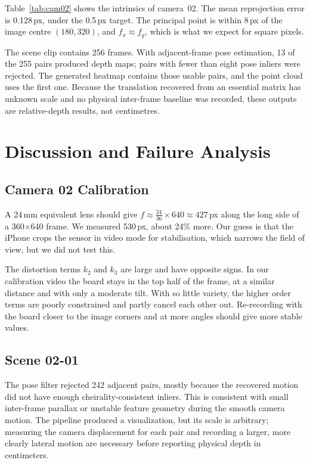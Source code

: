 \documentclass[conference]{assets/latex/IEEEtran}
\begin{document}
Table~\ref{tab:cam02} shows the intrinsics of camera~02. The mean reprojection error is 0.128\,px, under the 0.5\,px target. The principal point is within 8\,px of the image centre $(180, 320)$, and $f_x \approx f_y$, which is what we expect for square pixels.

The scene clip contains 256 frames. With adjacent-frame pose estimation, 13 of the 255 pairs produced depth maps; pairs with fewer than eight pose inliers were rejected. The generated heatmap contains those usable pairs, and the point cloud uses the first one. Because the translation recovered from an essential matrix has unknown scale and no physical inter-frame baseline was recorded, these outputs are relative-depth results, not centimetres.

\section{Discussion and Failure Analysis}

\subsection{Camera 02 Calibration}
A 24\,mm equivalent lens should give $f \approx \frac{24}{36} \times 640 \approx 427$\,px along the long side of a 360$\times$640 frame. We measured 530\,px, about 24\% more. Our guess is that the iPhone crops the sensor in video mode for stabilisation, which narrows the field of view, but we did not test this.

The distortion terms $k_2$ and $k_3$ are large and have opposite signs. In our calibration video the board stays in the top half of the frame, at a similar distance and with only a moderate tilt. With so little variety, the higher order terms are poorly constrained and partly cancel each other out. Re-recording with the board closer to the image corners and at more angles should give more stable values.

\subsection{Scene 02-01}
The pose filter rejected 242 adjacent pairs, mostly because the recovered motion did not have enough cheirality-consistent inliers. This is consistent with small inter-frame parallax or unstable feature geometry during the smooth camera motion. The pipeline produced a visualization, but its scale is arbitrary; measuring the camera displacement for each pair and recording a larger, more clearly lateral motion are necessary before reporting physical depth in centimeters.
\end{document}
